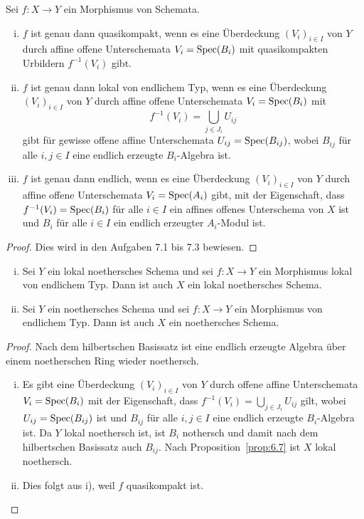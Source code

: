 \begin{prop}
\label{prop:6.10}
	Sei $f\colon X \to Y$ ein Morphismus von Schemata.
	\begin{enumerate}[i)]
		\item $f$ ist genau dann quasikompakt, wenn es eine Überdeckung $(V_i)_{i\in I}$ von $Y$ durch affine offene Unterschemata $V_i = \operatorname{Spec}(B_i)$ mit quasikompakten Urbildern $f^{-1}(V_i)$ gibt.
		\item $f$ ist genau dann lokal von endlichem Typ, wenn es eine Überdeckung $(V_i)_{i \in I}$ von $Y$ durch affine offene Unterschemata $V_i = \operatorname{Spec}(B_i)$ mit
		\[
			f^{-1}(V_i) = \bigcup_{j \in J_i}U_{ij}
		\]
		gibt für gewisse offene affine Unterschemata $U_{ij} = \operatorname{Spec}(B_{ij})$, wobei $B_{ij}$ für alle $i,j \in I$  eine endlich erzeugte $B_i$-Algebra ist.
		\item $f$ ist genau dann endlich, wenn es eine Überdeckung $(V_i)_{i \in I}$ von $Y$ durch affine offene Unterschemata $V_i = \operatorname{Spec}(A_i)$ gibt, mit der Eigenschaft, dass $f^{-1}(V_i) = \operatorname{Spec}(B_i)$ für alle $i \in I$ ein affines offenes Unterschema von $X$ ist und $B_i$ für alle $i \in I$ ein endlich erzeugter $A_i$-Modul ist.
	\end{enumerate}
	\begin{proof}
		Dies wird in den Aufgaben 7.1 bis 7.3 bewiesen.
	\end{proof}
\end{prop}

\begin{prop}
\label{prop:6.11}
	\begin{enumerate}[i)]
		\item Sei $Y$ ein lokal noethersches Schema und sei $f\colon X \to Y$ ein Morphismus lokal von endlichem Typ. Dann ist auch $X$ ein lokal noethersches Schema.
		\item Sei $Y$ ein noethersches Schema und sei $f \colon X \to Y$ ein Morphismus von endlichem Typ. Dann ist auch $X$ ein noethersches Schema.
	\end{enumerate}
	\begin{proof}
		Nach dem hilbertschen Basissatz ist eine endlich erzeugte Algebra über einem noetherschen Ring wieder noethersch.
		\begin{enumerate}[i)]
			\item Es gibt eine Überdeckung $(V_i)_{i \in I}$ von $Y$ durch offene affine Unterschemata $V_i=\operatorname{Spec}(B_i)$ mit der Eigenschaft, dass $f^{-1}(V_i) = \bigcup_{j \in J_i} U_{ij}$ gilt, wobei $U_{ij} = \operatorname{Spec}(B_{ij})$ ist und $B_{ij}$ für alle $i,j \in I$ eine endlich erzeugte $B_i$-Algebra ist. Da $Y$ lokal noethersch ist, ist $B_i$ nothersch und damit nach dem hilbertschen Basissatz auch $B_{ij}$. Nach Proposition~\ref{prop:6.7} ist $X$ lokal noethersch.
			\item Dies folgt aus i), weil $f$ quasikompakt ist.
		\end{enumerate}
	\end{proof}
\end{prop}

